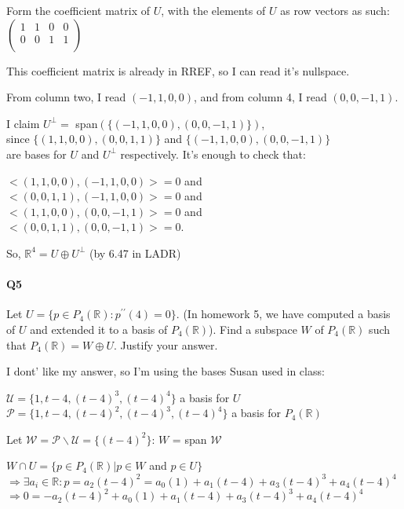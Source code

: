 \documentclass{article}
\begin{document}
Form the coefficient matrix of $U$, with the elements of $U$ as row
vectors as such:\\
$\begin{pmatrix}
  1&1&0&0\\
  0&0&1&1\\
\end{pmatrix}$

This coefficient matrix is already in RREF, so I can read it's
nullspace.

From
column two, I read $(-1,1,0,0)$, and from column 4, I read $(0,0,-1,1)$.

I claim $U^\perp =$ span$(\{(-1,1,0,0),(0,0,-1,1)\})$,\\
since $\{(1,1,0,0),(0,0,1,1)\}$ and
$\{(-1,1,0,0),(0,0,-1,1)\}$\\ are bases for $U$ and $U^\perp$
respectively. It's enough to check that:

$<(1,1,0,0),(-1,1,0,0)> = 0$ and\\
$<(0,0,1,1),(-1,1,0,0)> = 0$ and\\
$<(1,1,0,0),(0,0,-1,1)> =
0$ and\\
$<(0,0,1,1),(0,0,-1,1)> = 0$.

So, $\mathbb{R}^4 = U \oplus U^\perp$  (by 6.47 in LADR)



\paragraph{Q5} Let $U = \{p ∈ P_4(\mathbb{R}) : p^{\prime\prime}(4) = 0\}$. (In homework 5, we have
computed a basis of $U$ and extended it to a basis of $P_4(\mathbb{R})$).
Find a subspace $W$ of $P_4(\mathbb{R})$ such that $P_4(\mathbb{R}) = W ⊕ U$. Justify your answer.

I dont' like my answer, so I'm using the bases Susan used in class:

$\mathcal{U} = \{1,t-4,(t-4)^3,(t-4)^4\}$ a basis for $U$\\
$\mathcal{P} = \{1,t-4,(t-4)^2,(t-4)^3,(t-4)^4\}$ a basis for
$P_4(\mathbb{R})$

Let $\mathcal{W} = \mathcal{P} \backslash \mathcal{U} = \{(t-4)^2\}$:
$W$ = span $\mathcal{W}$

$W \cap U = \{p \in P_4(\mathbb{R})| p \in W$ and $p \in U\}$\\
$\Rightarrow \exists a_i \in \mathbb{R}: p = a_2(t-4)^2= a_0(1)+a_1(t-4)+a_3(t-4)^3+a_4(t-4)^4$\\
$\Rightarrow 0 = -a_2(t-4)^2+ a_0(1)+a_1(t-4)+a_3(t-4)^3+a_4(t-4)^4$
\end{document}
